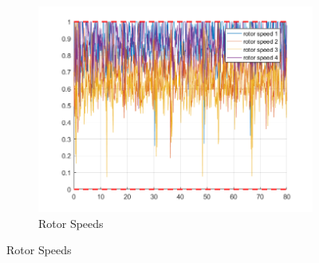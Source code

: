\documentclass[11pt]{article}
\begin{document}
\begin{enumerate}
\begin{figure}[ht]
\begin{subfigure}[c]{0.3\linewidth}
            \includegraphics[width=\linewidth]{Plots_12_NonlinearModel_Hexagon/06}
            \caption{Rotor Speeds}
        \end{subfigure}


\end{figure}
\end{enumerate}
\end{document}
